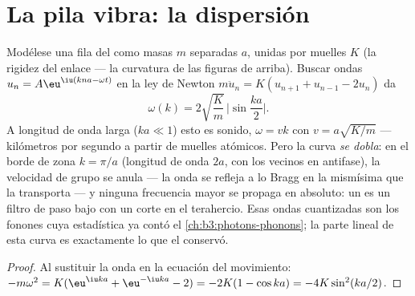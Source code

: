 \section{La pila vibra: la dispersión}

\begin{theorem}\label{thm:b3:crystalline-solids:dispersion}
Modélese una fila del  como masas $m$ separadas $a$, unidas por muelles
$K$ (la rigidez del enlace --- la curvatura de las figuras de arriba).
Buscar ondas $u_n = A\eu^{\iu(kna - \omega t)}$ en la ley de Newton
$m\ddot u_n = K(u_{n+1} + u_{n-1} - 2u_n)$ da
\[
\omega(k) = 2\sqrt{\frac{K}{m}}\,\Big|\sin\frac{ka}{2}\Big| .
\]
A longitud de onda larga ($ka \ll 1$) esto es sonido, $\omega = vk$ con
$v = a\sqrt{K/m}$ --- kilómetros por segundo a partir de muelles atómicos.
Pero la curva \emph{se dobla}: en el borde de zona $k = \pi/a$
(longitud de onda $2a$, con los vecinos en antifase), la velocidad de grupo
se anula --- la onda se refleja a lo Bragg en la mismísima  que la
transporta --- y ninguna frecuencia mayor se propaga en absoluto: un  es un
filtro de paso bajo con un corte en el terahercio. Esas ondas cuantizadas son
los fonones cuya estadística ya contó el \cref{ch:b3:photons-phonons};
la parte lineal de esta curva es exactamente lo que el 
conservó.
\end{theorem}

\begin{proof}
Al sustituir la onda en la ecuación del movimiento: $-m\omega^2 =
K(\eu^{\iu ka} + \eu^{-\iu ka} - 2) = -2K(1 - \cos ka) =
-4K\sin^2(ka/2)$.
\end{proof}

